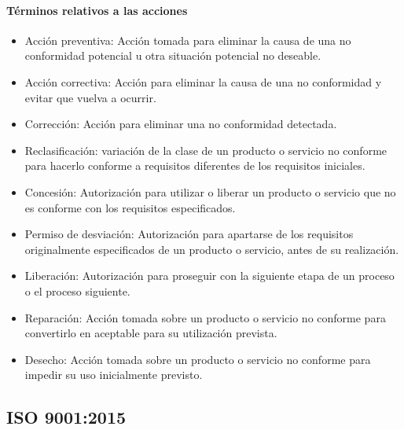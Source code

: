 					\paragraph{Términos relativos a las acciones}
						\begin{itemize}
							\item Acción preventiva: Acción tomada para eliminar la causa de una no conformidad potencial u otra situación potencial
							no deseable.
							
							\item Acción correctiva: Acción para eliminar la causa de una no conformidad y evitar que vuelva a ocurrir.
							
							\item Corrección: Acción para eliminar una no conformidad detectada.
							
							\item Reclasificación: variación de la clase de un producto o servicio no conforme para hacerlo
							conforme a requisitos diferentes de los requisitos iniciales.
							
							\newpage
							\thispagestyle{plain}
							
							\item  Concesión: Autorización para utilizar o liberar un producto o servicio que no es conforme con los requisitos especificados.
							
							\item Permiso de desviación: Autorización para apartarse de los requisitos originalmente especificados de un producto 
							o servicio, antes de su realización.
							
							\item Liberación: Autorización para proseguir con la siguiente etapa de un proceso o el proceso siguiente.
							
							\item Reparación: Acción tomada sobre un producto o servicio no conforme para convertirlo en aceptable para su utilización prevista.
							
							\item Desecho: Acción tomada sobre un producto o servicio no conforme para impedir su uso
							inicialmente previsto.
						\end{itemize}
					
		\subsection{ISO 9001:2015}
						